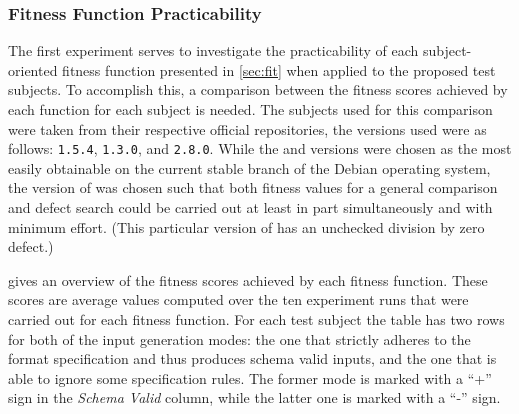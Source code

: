 \subsubsection{Fitness Function Practicability}
The first experiment serves to investigate the practicability of each subject-oriented fitness function
presented in \cref{sec:fit} when applied to the proposed test subjects. To accomplish this, a comparison
between the fitness scores achieved by each function for each subject is needed.
The subjects used for this comparison were taken from their respective official repositories, the versions
used were as follows: \libpng \texttt{1.5.4}, \libpcap \texttt{1.3.0}, and \libxml \texttt{2.8.0}. While the
\libpcap and \libxml versions were chosen as the most easily obtainable on the current stable branch of the
Debian operating system, the version of \libpng was chosen such that both fitness values for a general
comparison and defect search could be carried out at least in part simultaneously and with minimum effort.
(This particular version of \libpng has an unchecked division by zero defect.)

 gives an overview of
the fitness scores achieved by each fitness function. These scores are average values computed over the ten
experiment runs that were carried out for each fitness function. For each test subject the table has two rows
for both of the input generation modes: the one that strictly adheres to the format specification and thus
produces schema valid inputs, and the one that is able to ignore some specification rules. The former mode is
marked with a ``+'' sign in the \emph{Schema Valid} column, while the latter one is marked with a ``-'' sign.


